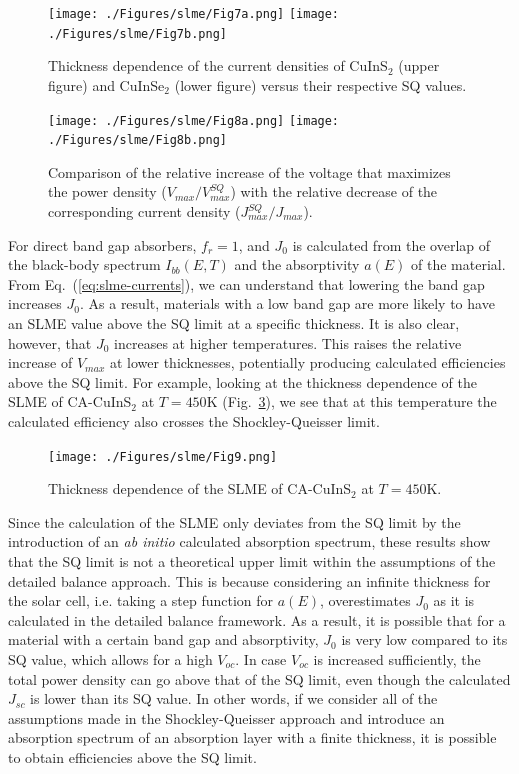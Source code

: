 \begin{refsection}
\begin{figure}[h] 
	\centering 
	\texttt{[image: ./Figures/slme/Fig7a.png]} 
	\texttt{[image: ./Figures/slme/Fig7b.png]}	 
	\caption{Thickness dependence of the current densities of CuInS$_2$ (upper 
figure) and CuInSe$_2$ (lower figure) versus their respective SQ values.} 
	\label{fig:slme-J_L} 
\end{figure} 
 
\begin{figure}[h] 
	\centering 
		\texttt{[image: ./Figures/slme/Fig8a.png]} 
		\texttt{[image: ./Figures/slme/Fig8b.png]} 
	\caption{Comparison of the relative increase of the voltage that maximizes 
the power density ($V_{max}/V_{max}^{SQ}$) with the relative decrease of the 
corresponding current density ($J_{max}^{SQ}/J_{max}$).} 
	\label{fig:slme-VJcomp} 
\end{figure} 
 
For direct band gap absorbers, $f_r = 1$, and $J_0$ is calculated from the 
overlap of the black-body spectrum $I_{bb}(E,T)$ and the absorptivity $a(E)$ 
of the material. From Eq.~(\ref{eq:slme-currents}), we can understand that 
lowering the band gap increases $J_0$. As a result, materials with a low band 
gap are more likely to have an SLME value above the SQ limit at a specific 
thickness. It is also clear, however, that $J_0$ increases at higher 
temperatures. This raises the relative increase of $V_{max}$ at lower 
thicknesses, potentially producing calculated efficiencies above the SQ limit. 
For example, looking at the thickness dependence of the SLME of CA-CuInS$_2$ 
at $T=450\si{\kelvin}$ (Fig.~\ref{fig:slme-SLME_highT}), we see that at this 
temperature the calculated efficiency also crosses the Shockley-Queisser 
limit.  
 
\begin{figure}[h] 
	\centering 
		\texttt{[image: ./Figures/slme/Fig9.png]} 
	\caption{Thickness dependence of the SLME of CA-CuInS$_2$ at $T = 
450$\si{\kelvin}.} 
	\label{fig:slme-SLME_highT} 
\end{figure} 
 
Since the calculation of the SLME only deviates from the SQ limit by the 
introduction of an \textit{ab initio} calculated absorption spectrum, these 
results show that the SQ limit is not a theoretical upper limit within the 
assumptions of the detailed balance approach. This is because considering an 
infinite thickness for the solar cell, i.e. taking a step function for $a(E)$, 
overestimates $J_0$ as it is calculated in the detailed balance framework. As 
a result, it is possible that for a material with a certain band gap and 
absorptivity, $J_0$ is very low compared to its SQ value, which allows for a 
high $V_{oc}$. In case $V_{oc}$ is increased sufficiently, the total power 
density can go above that of the SQ limit, even though the calculated $J_{sc}$ 
is lower than its SQ value. In other words, if we consider all of the 
assumptions made in the Shockley-Queisser approach and introduce an absorption 
spectrum of an absorption layer with a finite thickness, it is possible to 
obtain efficiencies above the SQ limit. 
 

\end{refsection}

